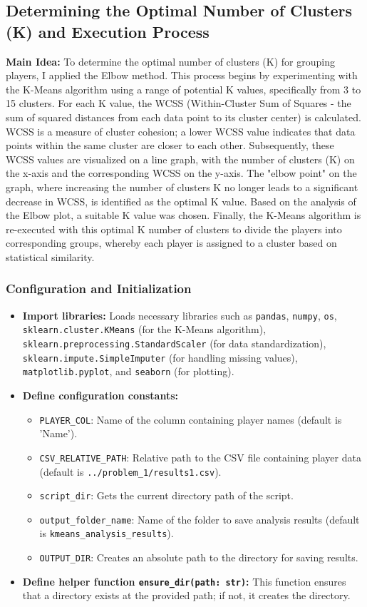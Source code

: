 \documentclass[12pt, a4paper]{report}
\begin{document}
\subsection{Determining the Optimal Number of Clusters (K) and Execution Process}
\textbf{Main Idea:} To determine the optimal number of clusters (K) for grouping players, I applied the Elbow method.
This process begins by experimenting with the K-Means algorithm using a range of potential K values, specifically from 3 to 15 clusters.
For each K value, the WCSS (Within-Cluster Sum of Squares - the sum of squared distances from each data point to its cluster center) is calculated.
WCSS is a measure of cluster cohesion; a lower WCSS value indicates that data points within the same cluster are closer to each other.
Subsequently, these WCSS values are visualized on a line graph, with the number of clusters (K) on the x-axis and the corresponding WCSS on the y-axis.
The "elbow point" on the graph, where increasing the number of clusters K no longer leads to a significant decrease in WCSS, is identified as the optimal K value.
Based on the analysis of the Elbow plot, a suitable K value was chosen.
Finally, the K-Means algorithm is re-executed with this optimal K number of clusters to divide the players into corresponding groups, whereby each player is assigned to a cluster based on statistical similarity.

\subsubsection*{Configuration and Initialization}
\begin{itemize}
    \item \textbf{Import libraries:} Loads necessary libraries such as \texttt{pandas}, \texttt{numpy}, \texttt{os}, \texttt{sklearn.cluster.KMeans} (for the K-Means algorithm), \texttt{sklearn.preprocessing.StandardScaler} (for data standardization), \texttt{sklearn.impute.SimpleImputer} (for handling missing values), \texttt{matplotlib.pyplot}, and \texttt{seaborn} (for plotting).
    \item \textbf{Define configuration constants:}
    \begin{itemize}
        \item \texttt{PLAYER\_COL}: Name of the column containing player names (default is 'Name').
        \item \texttt{CSV\_RELATIVE\_PATH}: Relative path to the CSV file containing player data (default is \texttt{../problem\_1/results1.csv}).
        \item \texttt{script\_dir}: Gets the current directory path of the script.
        \item \texttt{output\_folder\_name}: Name of the folder to save analysis results (default is \texttt{kmeans\_analysis\_results}).
        \item \texttt{OUTPUT\_DIR}: Creates an absolute path to the directory for saving results.
    \end{itemize}
    \item \textbf{Define helper function \texttt{ensure\_dir(path: str)}:} This function ensures that a directory exists at the provided path; if not, it creates the directory.
\end{itemize}
\end{document}
